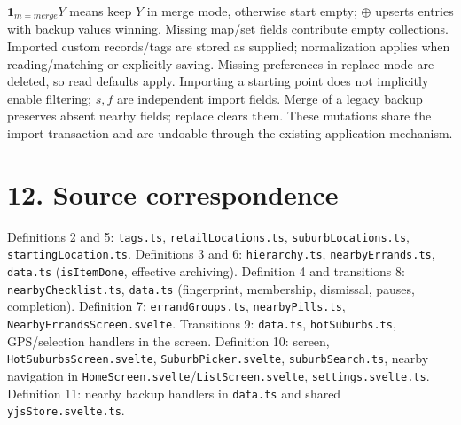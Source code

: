\documentclass[10pt,a4paper]{article}
\begin{document}
$\mathbf1_{m=merge}Y$ means keep $Y$ in merge mode, otherwise start empty; $\oplus$ upserts entries with backup values winning. Missing map/set fields contribute empty collections. Imported custom records/tags are stored as supplied; normalization applies when reading/matching or explicitly saving. Missing preferences in replace mode are deleted, so read defaults apply. Importing a starting point does not implicitly enable filtering; $s,\allowbreak f$ are independent import fields. Merge of a legacy backup preserves absent nearby fields; replace clears them. These mutations share the import transaction and are undoable through the existing application mechanism.

\section*{12. Source correspondence}

Definitions 2 and 5: \texttt{tags.\allowbreak ts}, \texttt{retailLocations.\allowbreak ts}, \texttt{suburbLocations.\allowbreak ts}, \texttt{startingLocation.\allowbreak ts}. Definitions 3 and 6: \texttt{hierarchy.\allowbreak ts}, \texttt{nearbyErrands.\allowbreak ts}, \texttt{data.\allowbreak ts} (\texttt{isItemDone}, effective archiving). Definition 4 and transitions 8: \texttt{nearbyChecklist.\allowbreak ts}, \texttt{data.\allowbreak ts} (fingerprint, membership, dismissal, pauses, completion). Definition 7: \texttt{errandGroups.\allowbreak ts}, \texttt{nearbyPills.\allowbreak ts}, \texttt{NearbyErrandsScreen.\allowbreak svelte}. Transitions 9: \texttt{data.\allowbreak ts}, \texttt{hotSuburbs.\allowbreak ts}, GPS/selection handlers in the screen. Definition 10: screen, \texttt{HotSuburbsScreen.\allowbreak svelte}, \texttt{SuburbPicker.\allowbreak svelte}, \texttt{suburbSearch.\allowbreak ts}, nearby navigation in \texttt{HomeScreen.\allowbreak svelte}/\texttt{ListScreen.\allowbreak svelte}, \texttt{settings.\allowbreak svelte.\allowbreak ts}. Definition 11: nearby backup handlers in \texttt{data.\allowbreak ts} and shared \texttt{yjsStore.\allowbreak svelte.\allowbreak ts}.
\end{document}
